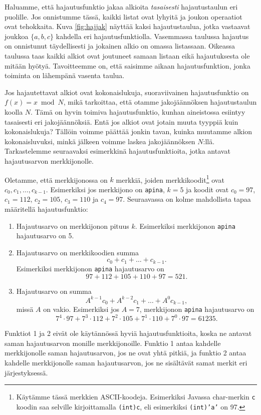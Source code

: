 Haluamme, että hajautusfunktio jakaa alkioita \emph{tasaisesti}
hajautustaulun eri puolille.
Jos onnistumme tässä, kaikki listat ovat lyhyitä ja
joukon operaatiot ovat tehokkaita.
Kuva \ref{fig:hajjak} näyttää kaksi hajautustaulua, jotka vastaavat
joukkoa $\{a,b,c\}$ kahdella eri hajautusfunktiolla.
Vasemmassa taulussa hajautus on onnistunut täydellisesti
ja jokainen alkio on omassa listassaan.
Oikeassa taulussa taas kaikki alkiot ovat joutuneet samaan
listaan eikä hajautuksesta ole mitään hyötyä.
Tavoitteemme on, että saisimme aikaan hajautusfunktion,
jonka toiminta on lähempänä vasenta taulua.

Jos hajautettavat alkiot ovat kokonaislukuja,
suoraviivainen hajautusfunktio on $f(x)=x \bmod N$,
mikä tarkoittaa, että otamme jakojäännöksen hajautustaulun koolla $N$.
Tämä on hyvin toimiva hajautusfunktio,
kunhan aineistossa esiintyy tasaisesti eri jakojäännöksiä.
Entä jos alkiot ovat jotain muuta tyyppiä kuin kokonaislukuja?
Tällöin voimme päättää jonkin tavan,
kuinka muutamme alkion kokonaisluvuksi,
minkä jälkeen voimme laskea jakojäännöksen $N$:llä.
Tarkastelemme seuraavaksi esimerkkinä hajautusfunktioita,
jotka antavat hajautusarvon merkkijonolle.

Oletamme, että merkkijonossa on $k$ merkkiä,
joiden merkkikoodit\footnote{Käytämme tässä merkkien ASCII-koodeja.
Esimerkiksi Javassa char-merkin \texttt{c} koodin saa
selville kirjoittamalla \texttt{(int)c}, eli esimerkiksi
\texttt{(int)'a'} on 97.} ovat $c_0,c_1,\dots,c_{k-1}$.
Esimerkiksi jos merkkijono on \texttt{apina},
$k=5$ ja koodit ovat $c_0=97$, $c_1=112$, $c_2=105$,
$c_3=110$ ja $c_4=97$.
Seuraavassa on kolme mahdollista tapaa määritellä hajautusfunktio:

\begin{enumerate}
\item Hajautusarvo on merkkijonon pituus $k$.
Esimerkiksi merkkijonon \texttt{apina} hajautusarvo on 5.
\item Hajautusarvo on merkkikoodien summa
\[ c_0 + c_1 + \dots + c_{k-1}.\]
Esimerkiksi merkkijonon \texttt{apina} hajautusarvo on
\[97+112+105+110+97=521.\]
\item Hajautusarvo on summa
\[ A^{k-1} c_0 + A^{k-2} c_1 + \dots + A^0 c_{k-1},\]
missä $A$ on vakio.
Esimerkiksi jos $A=7$, merkkijonon \texttt{apina} hajautusarvo on
\[7^4 \cdot 97+7^3 \cdot 112+7^2 \cdot 105+7^1 \cdot 110+7^0 \cdot 97=61235.\]
\end{enumerate}

Funktiot 1 ja 2 eivät ole käytännössä hyviä hajautusfunktioita,
koska ne antavat saman hajautusarvon monille merkkijonoille.
Funktio 1 antaa kahdelle merkkijonolle saman hajautusarvon,
jos ne ovat yhtä pitkiä,
ja funktio 2 antaa kahdelle merkkijonolle saman hajautusarvon,
jos ne sisältävät samat merkit eri järjestyksessä.

